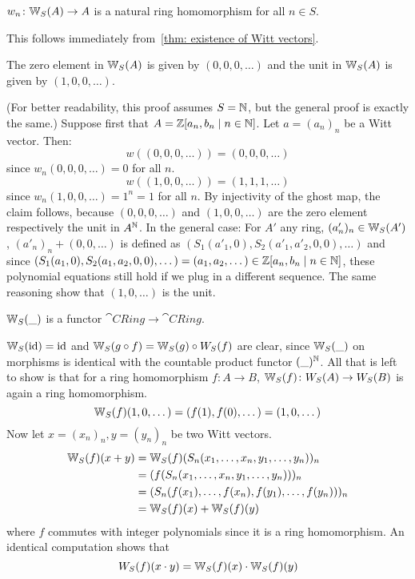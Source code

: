 \begin{cor} \label{cor: ghost components are nat trafos}
    $w_n \colon \mathbb{W}_S(A) \to A$ is a natural ring homomorphism for all $n \in S$.
\end{cor}
\begin{beweis}
    This follows immediately from~\ref{thm: existence of Witt vectors}.
\end{beweis}
\begin{lemma}
    The zero element in $\mathbb{W}_S(A)$ is given by $(0,0,0,\dots)$ and the
    unit in $\mathbb{W}_S(A)$ is given by $(1,0,0,\dots)$.
\end{lemma}
\begin{beweis}
    (For better readability, this proof assumes $S = \mathbb{N}$, but the general proof is exactly the same.)
    Suppose first that $A = \mathbb{Z}[a_n, b_n \mid n \in \mathbb{N}]$. Let $a = (a_n)_n$ be a Witt vector.
    Then:
    \[
       w((0,0,0,\dots)) = (0,0,0,\dots) 
    \]
    since $w_n(0,0,0,\dots) = 0$ for all $n$.
    \[
        w((1,0,0,\dots)) = (1,1,1,\dots)
    \] 
    since $w_n(1,0,0,\dots) = 1^n = 1$ for all $n$.
    By injectivity of the ghost map, the claim follows, because $(0,0,0,\dots)$
    and $(1,0,0,\dots)$ are the zero element respectively the unit in $A^{\mathbb{N}}$.
    In the general case: For $A'$ any ring, $(a'_n)_n \in \mathbb{W}_S(A')$,
    $(a'_n)_n + (0,0,\dots)$ is defined as $(S_1(a'_1,0),S_2(a'_1,a'_2,0,0),\dots)$
    and since $(S_1(a_1,0),S_2(a_1,a_2,0,0),\dots) = (a_1,a_2,\dots) \in \mathbb{Z}[a_n,b_n \mid n \in \mathbb{N}]$,
    these polynomial equations still hold if we plug in a different sequence. The
    same reasoning show that $(1,0,\dots)$ is the unit.
\end{beweis}
\begin{proposition} \label{prop: W is a functor}
    $\mathbb{W}_S(\_)$ is a functor $\cat{CRing} \to \cat{CRing}$.
\end{proposition}
\begin{beweis}
$\mathbb{W}_S(\operatorname{id}) = \operatorname{id}$ and $\mathbb{W}_S(g \circ f) = \mathbb{W}_S(g) \circ W_S(f)$
are clear, since $\mathbb{W}_S(\_)$ on morphisms is identical with the countable product
functor $(\_)^{\mathbb{N}}$. All that is left to show is that for a ring homomorphism
$f\colon A \to B$, $\mathbb{W}_S(f) \colon W_S(A) \to W_S(B)$ is again 
a ring homomorphism.
\[
    \mathbb{W}_S(f)(1,0,\dots) = (f(1),f(0),\dots) = (1,0,\dots)
\]
Now let $x = (x_n)_n, y = (y_n)_n$ be two Witt vectors.
\begin{align*}
    \mathbb{W}_S(f)(x+y) &= \mathbb{W}_S(f)(S_n(x_1,\dots,x_n,y_1,\dots,y_n))_n \\
    &= (f(S_n(x_1,\dots,x_n,y_1,\dots,y_n)))_n \\
    &= (S_n(f(x_1),\dots,f(x_n),f(y_1),\dots,f(y_n)))_n \\
    &= \mathbb{W}_S(f)(x) + \mathbb{W}_S(f)(y)
\end{align*}
where $f$ commutes with integer polynomials since it is a ring homomorphism.
An identical computation shows that
\[
    W_S(f)(x \cdot y) = \mathbb{W}_S(f)(x) \cdot \mathbb{W}_S(f)(y)
\]
\end{beweis}
